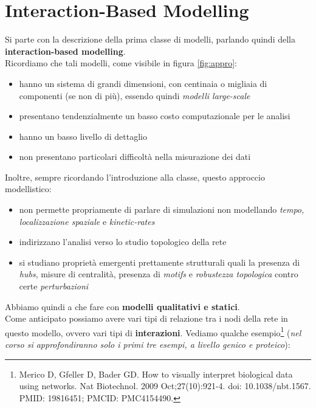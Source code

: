 \documentclass[a4paper,12pt, oneside]{book}
\begin{document}
\chapter{Interaction-Based Modelling}
Si parte con la descrizione della prima classe di modelli, parlando quindi della
\textbf{interaction-based modelling}.\\
Ricordiamo che tali modelli, come visibile in figura \ref{fig:appro}:
\begin{itemize}
  \item hanno un sistema di grandi dimensioni, con centinaia o migliaia di
  componenti (se non di più),
  essendo quindi \textit{modelli large-scale}
  \item presentano tendenzialmente un basso costo computazionale per le analisi
  \item hanno un basso livello di dettaglio
  \item non presentano particolari difficoltà nella misurazione dei dati
\end{itemize}
Inoltre, sempre ricordando l'introduzione alla classe, questo approccio
modellistico:
\begin{itemize}
  \item non permette propriamente di parlare di simulazioni non modellando
  \textit{tempo, localizzazione spaziale} e \textit{kinetic-rates} 
  \item indirizzano l'analisi verso lo studio topologico della rete
  \item si studiano proprietà emergenti prettamente strutturali quali la
  presenza di \textit{hubs}, misure di centralità, presenza di \textit{motifs} e
  \textit{robustezza topologica} contro certe \textit{perturbazioni}
\end{itemize}
Abbiamo quindi a che fare con \textbf{modelli qualitativi e statici}.\\
Come anticipato possiamo avere vari tipi di relazione tra i nodi della rete in
questo modello, ovvero vari tipi di \textbf{interazioni}.
\newpage
\noindent
Vediamo qualche
esempio\footnote{Merico D, Gfeller D, Bader GD. How to visually interpret
  biological data using networks. Nat Biotechnol. 2009 Oct;27(10):921-4. doi:
  10.1038/nbt.1567. PMID: 19816451; PMCID: PMC4154490.} (\textit{nel corso si
  approfondiranno solo i primi tre esempi, a livello genico e proteico}): 
\end{document}
